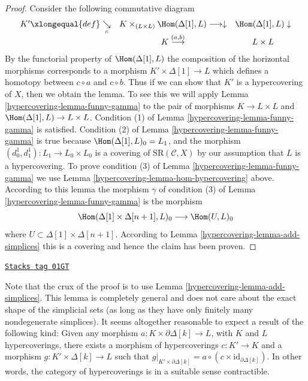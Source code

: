 \begin{proof}

Consider the following commutative diagram
$$
\begin{array}{ccc}K' \xlongequal{def}\underset{c}{\searrow} & K \times_{(L \times L)} \Hom(\Delta[1], L)
\longrightarrow\downarrow & \Hom(\Delta[1], L) \downarrow \\  & K \overset{(a, b)}{\longrightarrow} & L \times L\end{array}
$$
By the functorial property of $\Hom(\Delta[1], L)$
the composition of the horizontal morphisms
corresponds to a morphism $K' \times \Delta[1] \to L$ which
defines a homotopy between $c \circ a$ and $c \circ b$.
Thus if we can show that $K'$ is a
hypercovering of $X$, then we obtain the lemma.
To see this we will apply Lemma \ref{hypercovering-lemma-funny-gamma}
to the pair of morphisms $K \to L \times L$
and $\Hom(\Delta[1], L) \to L \times L$.
Condition (1) of Lemma \ref{hypercovering-lemma-funny-gamma} is satisfied.
Condition (2) of Lemma \ref{hypercovering-lemma-funny-gamma} is true because
$\Hom(\Delta[1], L)_0 = L_1$, and the morphism
$(d^1_0, d^1_1) : L_1 \to L_0 \times L_0$ is a
covering of $\text{SR}(\mathcal{C}, X)$ by our
assumption that $L$ is a hypercovering.
To prove condition (3) of Lemma \ref{hypercovering-lemma-funny-gamma}
we use Lemma \ref{hypercovering-lemma-hom-hypercovering} above. According
to this lemma the morphism $\gamma$ of condition (3) of Lemma
\ref{hypercovering-lemma-funny-gamma} is the morphism
$$
\Hom(\Delta[1] \times \Delta[n + 1], L)_0
\longrightarrow
\Hom(U, L)_0
$$
where $U \subset \Delta[1] \times \Delta[n + 1]$.
According to Lemma \ref{hypercovering-lemma-add-simplices}
this is a covering and hence the claim has been proven.
\end{proof}

\begin{remark}
\label{hypercovering-remark-contractible-category}
\href{https://stacks.math.columbia.edu/tag/01GT}{\texttt{Stacks tag 01GT}}

Note that the crux of the proof is to use
Lemma \ref{hypercovering-lemma-add-simplices}. This lemma
is completely general and does not care about the
exact shape of the simplicial sets (as long as they
have only finitely many nondegenerate simplices).
It seems altogether reasonable to expect a result
of the following kind:
Given any morphism $a : K \times \partial \Delta[k]
\to L$, with $K$ and $L$ hypercoverings, there
exists a morphism of hypercoverings $c : K' \to K$
and a morphism  $g : K' \times \Delta[k] \to L$
such that
$g|_{K' \times \partial \Delta[k]} =
a \circ (c \times \text{id}_{\partial \Delta[k]})$.
In other words, the category of hypercoverings is in
a suitable sense contractible.
\end{remark}

